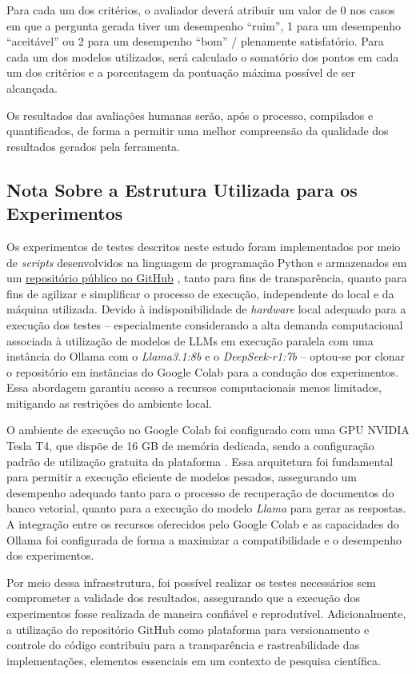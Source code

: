 Para cada um dos critérios, o avaliador deverá atribuir um valor de 0 nos casos em que a pergunta gerada tiver um desempenho ``ruim'', 1 para um desempenho ``aceitável'' ou 2 para um desempenho ``bom'' / plenamente satisfatório. Para cada um dos modelos utilizados, será calculado o somatório dos pontos em cada um dos critérios e a porcentagem da pontuação máxima possível de ser alcançada.

Os resultados das avaliações humanas serão, após o processo, compilados e quantificados, de forma a permitir uma melhor compreensão da qualidade dos resultados gerados pela ferramenta.


\subsection{Nota Sobre a Estrutura Utilizada para os Experimentos}
\label{subsec:Metodologia.6.4}

Os experimentos de testes descritos neste estudo foram implementados por meio de \textit{scripts} desenvolvidos na linguagem de programação Python e armazenados em um \href{https://github.com/saintclairlima/assistente-busca}{repositório público no GitHub} \cite{REPOSITORIO:1}, tanto para fins de transparência, quanto para fins de agilizar e simplificar o processo de execução, independente do local e da máquina utilizada. Devido à indisponibilidade de \textit{hardware} local adequado para a execução dos testes -- especialmente considerando a alta demanda computacional associada à utilização de modelos de \ac{LLM}s em execução paralela com uma instância do Ollama com o \textit{Llama3.1:8b} e o \textit{DeepSeek-r1:7b} -- optou-se por clonar o repositório em instâncias do Google Colab para a condução dos experimentos. Essa abordagem garantiu acesso a recursos computacionais menos limitados, mitigando as restrições do ambiente local.

O ambiente de execução no Google Colab foi configurado com uma GPU NVIDIA Tesla T4, que dispõe de 16 GB de memória dedicada, sendo a configuração padrão de utilização gratuita da plataforma \cite{HARDWARE:1, HARDWARE:2}. Essa arquitetura foi fundamental para permitir a execução eficiente de modelos pesados, assegurando um desempenho adequado tanto para o processo de recuperação de documentos do banco vetorial, quanto para a execução do modelo \textit{Llama} para gerar as respostas. A integração entre os recursos oferecidos pelo Google Colab e as capacidades do Ollama foi configurada de forma a maximizar a compatibilidade e o desempenho dos experimentos.

Por meio dessa infraestrutura, foi possível realizar os testes necessários sem comprometer a validade dos resultados, assegurando que a execução dos experimentos fosse realizada de maneira confiável e reprodutível. Adicionalmente, a utilização do repositório GitHub \cite{REPOSITORIO:1} como plataforma para versionamento e controle do código contribuiu para a transparência e rastreabilidade das implementações, elementos essenciais em um contexto de pesquisa científica.